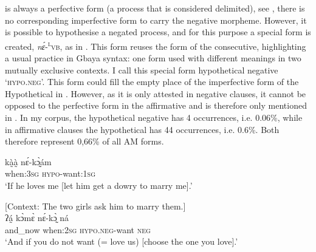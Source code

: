 \documentclass[output=paper,colorlinks=true, citecolor=brown]{langscibook}
\begin{document}
is always a perfective form (a process that is considered delimited), see , there is no corresponding imperfective form to carry the negative morpheme. However, it is possible to hypothesise a negated process, and for this purpose a special form is created, \textit{nɛ́}-\textsuperscript{\textsc{l}}\textsc{vb}, as in 
. This form reuses the form of the consecutive, highlighting a usual practice in Gbaya syntax: one form used with different meanings in two mutually exclusive contexts. I call this special form hypothetical negative ‘\textsc{hypo.neg}’. This form could fill the empty place of the imperfective form of the Hypothetical in . However, as it is only attested in negative clauses, it cannot be opposed to the perfective form in the affirmative and is therefore only mentioned in . In my corpus, the hypothetical negative has 4 occurrences, i.e. 0.06\%, while in affirmative clauses the hypothetical has 44 occurrences, i.e. 0.6\%. Both therefore represent 0,66\% of all AM forms.

\ea\label{ex:gba:8}
    \gll kà̰à̰  nɛ́-kɔ̰̀ám   \\ 
         when:\textsc{3sg} \textsc{hypo}-want:\textsc{1sg} \\
    \glt ‘If he loves me [let him get a dowry to marry me].’
\z 

\ea\label{ex:gba:9}[Context: The two girls ask him to marry them.] \\
    \gll ʔá̰    kɔ̀mɛ̀ nɛ́-kɔ̰̀ ná \\ 
         and\_now when:2\textsc{sg} \textsc{hypo.neg}-want \textsc{neg} \\
    \glt ‘And if you do not want (= love us) [choose the one you love].’
\z 
\end{document}

